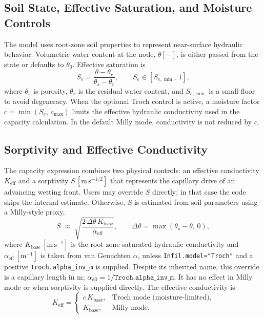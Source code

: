 \documentclass[12pt]{article}
\begin{document}
\subsection{Soil State, Effective Saturation, and Moisture Controls}
The model uses root-zone soil properties to represent near-surface hydraulic behavior. Volumetric water content at the node, \(\theta[-]\), is either passed from the state or defaults to \(\theta_0\). Effective saturation is
\[
S_e=\frac{\theta-\theta_r}{\theta_s-\theta_r}, \qquad S_e\in [S_{e,\min},\,1],
\]
where \(\theta_s\) is porosity, \(\theta_r\) is the residual water content, and \(S_{e,\min}\) is a small floor to avoid degeneracy. When the optional Troch control is active, a moisture factor \(c=\min(S_e,\,c_{\max})\) limits the effective hydraulic conductivity used in the capacity calculation. In the default Milly mode, conductivity is not reduced by \(c\).

\subsection{Sorptivity and Effective Conductivity}
The capacity expression combines two physical controls: an effective conductivity \(K_{\mathrm{eff}}\) and a sorptivity \(S\,[\mathrm{m\,s^{-1/2}}]\) that represents the capillary drive of an advancing wetting front. Users may override \(S\) directly; in that case the code skips the internal estimate. Otherwise, \(S\) is estimated from soil parameters using a Milly-style proxy,
\[
S \;\approx\; \sqrt{\frac{2\,\Delta\theta\,K_{\mathrm{base}}}{\alpha_{\mathrm{eff}}}},
\qquad \Delta\theta=\max(\theta_s-\theta,\,0),
\]
where \(K_{\mathrm{base}}\,[\mathrm{m\,s^{-1}}]\) is the root-zone saturated hydraulic conductivity and \(\alpha_{\mathrm{eff}}\,[\mathrm{m^{-1}}]\) is taken from van Genuchten $\alpha$, unless \texttt{Infil.model="Troch"} and a positive \texttt{Troch.alpha\_inv\_m} is supplied. Despite its inherited name, this override is a capillary length in m; $\alpha_{\mathrm{eff}}=1/\texttt{Troch.alpha\_inv\_m}$. It has no effect in Milly mode or when sorptivity is supplied directly. The effective conductivity is
\[
K_{\mathrm{eff}}=
\begin{cases}
c\,K_{\mathrm{base}}, & \text{Troch mode (moisture-limited)},\\
K_{\mathrm{base}}, & \text{Milly mode}.
\end{cases}
\]
\end{document}
